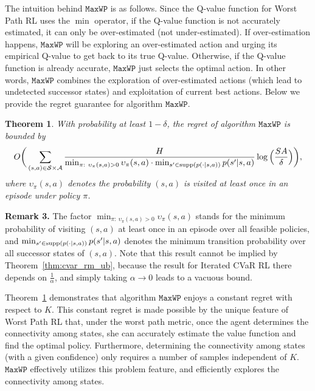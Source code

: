\documentclass{article} %
\newtheorem{theorem}{Theorem}
\newcommand{\cA}{\mathcal{A}}
\newcommand{\cS}{\mathcal{S}}
\newcommand{\supp}{\textup{supp}}
\newcommand{\algmin}{\mathtt{MaxWP}}
\newcommand{\revision}[1]{{\color{black} #1}}
\begin{document}
	\revision{The intuition behind $\algmin$ is as follows. 
		Since the Q-value function for Worst Path RL uses the $\min$ operator, if the Q-value function is not accurately estimated, it can only be over-estimated (not under-estimated). 
		If  over-estimation happens, $\algmin$ will be exploring an over-estimated action and urging its empirical Q-value to get back to its true Q-value. Otherwise, if the Q-value function is already accurate, $\algmin$ just selects the optimal action.
		In other words, $\algmin$ combines the exploration of over-estimated actions (which lead to undetected successor states) and  exploitation of current best actions.} 
	Below we provide the regret guarantee for algorithm $\algmin$. 
	\begin{theorem} \label{thm:min_regret_ub}
		With probability at least $1-\delta$, the regret of algorithm $\algmin$ is bounded by
		\begin{align*}
			O \bigg( \sum_{(s,a) \in \cS \times \cA} \frac{H}{\min_{\begin{subarray}{c} \pi: \ \upsilon_{\pi}(s,a)>0 \end{subarray}} \upsilon_{\pi}(s,a) \cdot \min_{s' \in \supp( p(\cdot|s,a))} p(s'|s,a) } \log \Big( \frac{SA}{\delta} \Big) \bigg) ,
		\end{align*}
		where $\upsilon_{\pi}(s,a)$ denotes the probability  $(s,a)$ is visited at least once in an episode under policy $\pi$.  
	\end{theorem}
	
	\textbf{Remark 3.}
	The factor $\min_{ \pi: \ \upsilon_{\pi}(s,a)>0} \upsilon_{\pi}(s,a)$ stands for the minimum probability of visiting $(s,a)$ at least once in an episode over all feasible policies, and $\min_{s' \in \supp( p(\cdot|s,a))} p(s'|s,a)$ denotes the minimum transition probability over all successor states of $(s,a)$. 
	Note that this result cannot be implied by Theorem~\ref{thm:cvar_rm_ub}, because the result for Iterated CVaR RL there depends on $\frac{1}{\alpha}$, and simply taking $\alpha \to 0$ leads to a vacuous bound.
	
	Theorem~\ref{thm:min_regret_ub} demonstrates that algorithm $\algmin$ enjoys a constant regret with respect to $K$. This constant regret is made possible by the 
	unique feature of Worst Path RL that, under the worst path metric, once the agent determines the connectivity among states, she can accurately estimate the value function and find the optimal policy. Furthermore, determining the connectivity among states (with a given confidence) only requires a number of samples independent of $K$. $\algmin$ effectively utilizes this problem feature, and efficiently explores the connectivity among states.
	
\end{document}
